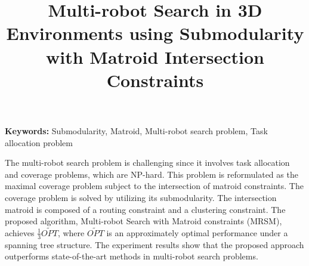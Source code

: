 \title{Multi-robot Search in 3D Environments using Submodularity with Matroid Intersection Constraints}
\begin{abstracten}
{\bf \sf Keywords:} Submodularity, Matroid, Multi-robot search problem, Task allocation problem

\vspace{2em}

The multi-robot search problem is challenging since it involves task allocation and coverage problems, which are NP-hard.
This problem is reformulated as the maximal coverage problem subject to the intersection of matroid constraints.
The coverage problem is solved by utilizing its submodularity.
The intersection matroid is composed of a routing constraint and a clustering constraint.
The proposed algorithm, Multi-robot Search with Matroid constraints (MRSM), achieves $\frac{1}{3}\widetilde{OPT}$, where $\widetilde{OPT}$ is an approximately optimal performance under a spanning tree structure.
The experiment results show that the proposed approach outperforms state-of-the-art methods in multi-robot search problems.
\end{abstracten}


